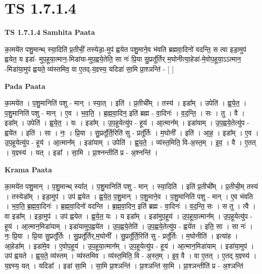 \documentclass[17pt]{extarticle}
\begin{document}
\section{ TS 1.7.1.4 }

\textbf{TS 1.7.1.4 } \newline
\textbf{Samhita Paata} \newline

का॒मये॑त पशु॒मान्थ् स्या॒दिति॑ प्र॒तीचीं॒ तस्येडा॒-मुप॑ ह्वयेत पशु॒माने॒व भ॑वति ब्रह्मवा॒दिनो॑ वदन्ति॒ स त्वा इडा॒मुप॑ ह्वयेत॒ य इडा॑- मुप॒हूया॒त्मान॒-मिडा॑या-मुप॒ह्वये॒तेति॒ सा नः॑ प्रि॒या सु॒प्रतू᳚र्तिर् म॒घोनीत्या॒हेडा॑-मे॒वोप॒हूया॒ऽऽत्मान॒ -मिडा॑या॒मुप॑ ह्वयते॒ व्य॑स्तमिव॒ वा ए॒तद्-य॒ज्ञ्स्य॒ यदिडा॑ सा॒मि प्रा॒श्ञन्ति॑ - [ ] \newline

\textbf{Pada Paata} \newline

का॒मये॑त । प॒शु॒मानिति॑ पशु - मान् । स्या॒त् । इति॑ । प्र॒तीची᳚म् । तस्य॑ । इडा᳚म् । उपेति॑ । ह्व॒ये॒त॒ । प॒शु॒मानिति॑ पशु - मान् । ए॒व । भ॒व॒ति॒ । ब्र॒ह्म॒वा॒दिन॒ इति॑ ब्रह्म - वा॒दिनः॑ । व॒द॒न्ति॒ । सः । तु । वै । इडा᳚म् । उपेति॑ । ह्व॒ये॒त॒ । यः । इडा᳚म् । उ॒प॒हूयेत्यु॑प - हूय॑ । आ॒त्मान᳚म् । इडा॑याम् । उ॒प॒ह्वये॒तेत्यु॑प - ह्वये॑त । इति॑ । सा । नः॒ । प्रि॒या । सु॒प्रतू᳚र्ति॒रिति॑ सु - प्रतू᳚र्तिः । म॒घोनी᳚ । इति॑ । आ॒ह॒ । इडा᳚म् । ए॒व । उ॒प॒हूयेत्यु॑प - हूय॑ । आ॒त्मान᳚म् । इडा॑याम् । उपेति॑ । ह्व॒य॒ते॒ । व्य॑स्त॒मिति॒ वि-अ॒स्त॒म् । इ॒व॒ । वै । ए॒तत् । य॒ज्ञ्स्य॑ । यत् । इडा᳚ । सा॒मि । प्रा॒श्नन्तीति॑ प्र - अ॒श्नन्ति॑ ।  \newline


\textbf{Krama Paata} \newline

का॒मये॑त पशु॒मान् । प॒शु॒मान्थ् स्या᳚त् । प॒शु॒मानिति॑ पशु - मान् । स्या॒दिति॑ । इति॑ प्र॒तीची᳚म् । प्र॒तीची॒म् तस्य॑ । तस्येडा᳚म् । इडा॒मुप॑ । उप॑ ह्वयेत । ह्व॒ये॒त॒ प॒शु॒मान् । प॒शु॒माने॒व । प॒शु॒मानिति॑ पशु - मान् । ए॒व भ॑वति । भ॒व॒ति॒ ब्र॒ह्म॒वा॒दिनः॑ । ब्र॒ह्म॒वा॒दिनो॑ वदन्ति । ब्र॒ह्म॒वा॒दिन॒ इति॑ ब्रह्म - वा॒दिनः॑ । व॒द॒न्ति॒ सः । स तु । त्वै । वा इडा᳚म् । इडा॒मुप॑ । उप॑ ह्वयेत । ह्व॒ये॒त॒ यः । य इडा᳚म् । इडा॑मुप॒हूय॑ । उ॒प॒हूया॒त्मान᳚म् । उ॒प॒हूयेत्यु॑प - हूय॑ । आ॒त्मान॒मिडा॑याम् । इडा॑यामुप॒ह्वये॑त । उ॒प॒ह्वये॒तेति॑ । उ॒प॒ह्वये॒तेत्यु॑प - ह्वये॑त । इति॒ सा । सा नः॑ । नः॒ प्रि॒या । प्रि॒या सु॒प्रतू᳚र्तिः । सु॒प्रतू᳚र्तिर्,म॒घोनी᳚ । सु॒प्रतू᳚र्ति॒रिति॑ सु - प्रतू᳚र्तिः । म॒घोनीति॑ । इत्या॑ह । आ॒हेडा᳚म् । इडा॑मे॒व । ए॒वोप॒हूय॑ । उ॒प॒हूया॒त्मान᳚म् । उ॒प॒हूयेत्यु॑प - हूय॑ । आ॒त्मान॒मिडा॑याम् । इडा॑या॒मुप॑ । उप॑ ह्वयते । ह्व॒य॒ते॒ व्य॑स्तम् । व्य॑स्तमिव । व्य॑स्त॒मिति॒ वि - अ॒स्त॒म् । इ॒व॒ वै । वा ए॒तत् । ए॒तद् य॒ज्ञ्स्य॑ । य॒ज्ञ्स्य॒ यत् । यदिडा᳚ । इडा॑ सा॒मि । सा॒मि प्रा॒श्ञन्ति॑ । प्रा॒श्ञन्ति॑ सा॒मि । प्रा॒श्ञन्तीति॑ प्र - अ॒श्ञन्ति॑ \newline
\end{document}
